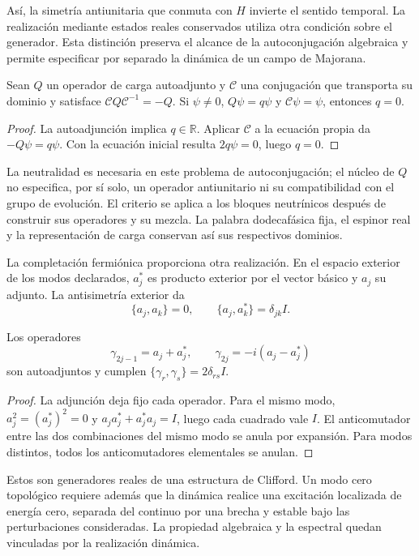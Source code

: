 Así, la simetría antiunitaria que conmuta con $H$ invierte el sentido
temporal. La realización mediante estados reales conservados utiliza
otra condición sobre el generador. Esta distinción preserva el alcance
de la autoconjugación algebraica y permite especificar por separado la
dinámica de un campo de Majorana.

\begin{proposition}
\label{vi:prop:carga-real}
Sean $Q$ un operador de carga autoadjunto y $\mathcal C$ una
conjugación que transporta su dominio y satisface
$\mathcal C Q\mathcal C^{-1}=-Q$. Si $\psi\ne0$,
$Q\psi=q\psi$ y $\mathcal C\psi=\psi$, entonces $q=0$.
\end{proposition}
\begin{proof}
La autoadjunción implica $q\in\mathbb R$. Aplicar $\mathcal C$
a la ecuación propia da $-Q\psi=q\psi$. Con la ecuación inicial
resulta $2q\psi=0$, luego $q=0$.
\end{proof}

La neutralidad es necesaria en este problema de autoconjugación;
el núcleo de $Q$ no especifica, por sí solo, un operador antiunitario
ni su compatibilidad con el grupo de evolución. El criterio se aplica a los
bloques neutrínicos después de construir sus operadores y su mezcla.
La palabra dodecafásica fija, el espinor real y la representación de
carga conservan así sus respectivos dominios.

La completación fermiónica proporciona otra realización. En el
espacio exterior de los modos declarados, $a_j^*$ es producto
exterior por el vector básico y $a_j$ su adjunto. La antisimetría
exterior da
\[
 \{a_j,a_k\}=0,\qquad \{a_j,a_k^*\}=\delta_{jk}I.
\]

\begin{proposition}
\label{vi:prop:car-real}
Los operadores
\[
 \gamma_{2j-1}=a_j+a_j^*,\qquad
 \gamma_{2j}=-i(a_j-a_j^*)
\]
son autoadjuntos y cumplen $\{\gamma_r,\gamma_s\}=2\delta_{rs}I$.
\end{proposition}
\begin{proof}
La adjunción deja fijo cada operador. Para el mismo modo,
$a_j^2=(a_j^*)^2=0$ y $a_ja_j^*+a_j^*a_j=I$, luego cada
cuadrado vale $I$. El anticomutador entre las dos combinaciones
del mismo modo se anula por expansión. Para modos distintos,
todos los anticomutadores elementales se anulan.
\end{proof}

Estos son generadores reales de una estructura de Clifford. Un modo
cero topológico requiere además que la dinámica realice una excitación
localizada de energía cero, separada del continuo por una brecha y
estable bajo las perturbaciones consideradas. La propiedad algebraica
y la espectral quedan vinculadas por la realización dinámica.

